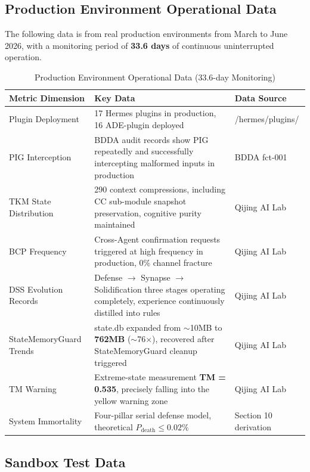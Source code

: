 \documentclass[11pt,a4paper]{article}
\begin{document}
\subsection{Production Environment Operational Data}
\label{sec:11.3}

The following data is from real production environments from March to June 2026, with a monitoring period of \textbf{33.6 days} of continuous uninterrupted operation.

\begin{table}[htbp]
\centering
\caption{Production Environment Operational Data (33.6-day Monitoring)}
\label{tab:production-data}
\begin{tabular}{p{}p{}p{}}
\hline
\textbf{Metric Dimension} & \textbf{Key Data} & \textbf{Data Source} \\
\hline
Plugin Deployment & 17 Hermes plugins in production, 16 ADE-plugin deployed & /hermes/plugins/ \\
PIG Interception & BDDA audit records show PIG repeatedly and successfully intercepting malformed inputs in production & BDDA fct-001 \\
TKM State Distribution & 290 context compressions, including CC sub-module snapshot preservation, cognitive purity maintained & Qijing AI Lab \\
BCP Frequency & Cross-Agent confirmation requests triggered at high frequency in production, 0\% channel fracture & Qijing AI Lab \\
DSS Evolution Records & Defense $\rightarrow$ Synapse $\rightarrow$ Solidification three stages operating completely, experience continuously distilled into rules & Qijing AI Lab \\
StateMemoryGuard Trends & state.db expanded from $\sim$10MB to \textbf{762MB} ($\sim$76$\times$), recovered after StateMemoryGuard cleanup triggered & Qijing AI Lab \\
TM Warning & Extreme-state measurement \textbf{TM = 0.535}, precisely falling into the yellow warning zone & Qijing AI Lab \\
System Immortality & Four-pillar serial defense model, theoretical $P_{\text{death}} \leq 0.02\%$ & Section 10 derivation \\
\hline
\end{tabular}
\end{table}

\subsection{Sandbox Test Data}
\label{sec:11.4}
\end{document}
